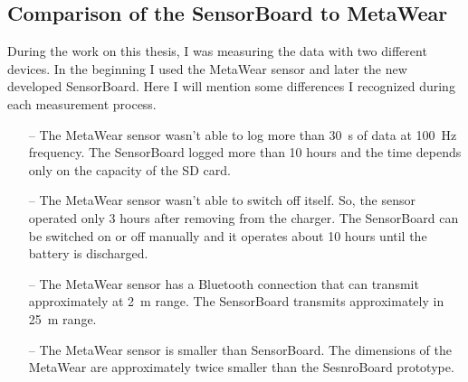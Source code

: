 \subsection{Comparison of the SensorBoard to MetaWear}
During the work on this thesis, I was measuring the data with two different devices. In the beginning I used the MetaWear \cite{MetaWear} sensor and later the new developed SensorBoard. Here I will mention some differences I recognized during each measurement process.
\begin{itemize}
    \item[--] The MetaWear sensor wasn't able to log more than \SI{30}{s} of data at \SI{100}{Hz} frequency. The SensorBoard logged more than 10 hours and the time depends only on the capacity of the SD card.
    \item[--] The MetaWear sensor wasn't able to switch off itself. So, the sensor operated only 3 hours after removing from the charger. The SensorBoard can be switched on or off manually and it operates about 10 hours until the battery is discharged.
    \item[--] The MetaWear sensor has a Bluetooth connection that can transmit approximately at \SI{2}{m} range. The SensorBoard transmits approximately in \SI{25}{m} range.
    \item[--] The MetaWear sensor is smaller than SensorBoard. The dimensions of the MetaWear are approximately twice smaller than the SesnroBoard prototype.
\end{itemize}
